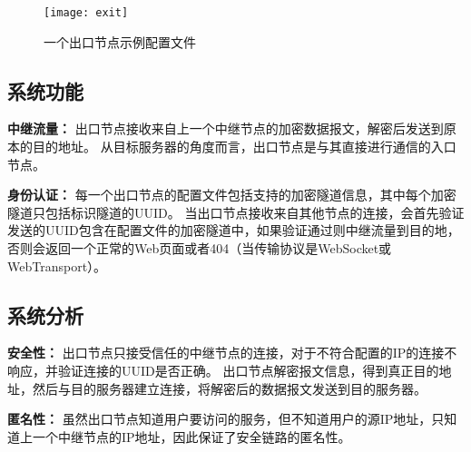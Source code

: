 \begin{figure}[H]
  \centering
  \texttt{[image: exit]}
  \caption{一个出口节点示例配置文件}
\end{figure}

\subsection{系统功能}

\textbf{中继流量：}
出口节点接收来自上一个中继节点的加密数据报文，解密后发送到原本的目的地址。
从目标服务器的角度而言，出口节点是与其直接进行通信的入口节点。

\textbf{身份认证：}
每一个出口节点的配置文件包括支持的加密隧道信息，其中每个加密隧道只包括标识隧道的UUID。
当出口节点接收来自其他节点的连接，会首先验证发送的UUID包含在配置文件的加密隧道中，如果验证通过则中继流量到目的地，否则会返回一个正常的Web页面或者404（当传输协议是WebSocket或WebTransport）。

\subsection{系统分析}

\textbf{安全性：}
出口节点只接受信任的中继节点的连接，对于不符合配置的IP的连接不响应，并验证连接的UUID是否正确。
出口节点解密报文信息，得到真正目的地址，然后与目的服务器建立连接，将解密后的数据报文发送到目的服务器。

\textbf{匿名性：}
虽然出口节点知道用户要访问的服务，但不知道用户的源IP地址，只知道上一个中继节点的IP地址，因此保证了安全链路的匿名性。
